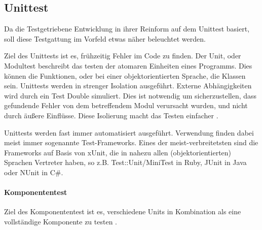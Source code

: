 \subsection{Unittest}
Da die Testgetriebene Entwicklung in ihrer Reinform auf dem Unittest basiert, soll diese Testgattung im Vorfeld etwas näher beleuchtet werden.

Ziel des Unittests ist es, frühzeitig Fehler im Code zu finden. Der Unit, oder Modultest beschreibt das testen der atomaren Einheiten eines Programms. Dies können die Funktionen, oder bei einer objektorientierten Sprache, die Klassen sein. Unittests werden in strenger Isolation ausgeführt. Externe Abhängigkeiten wird durch ein Test Double simuliert. Dies ist notwendig um sicherzustellen, dass gefundende Fehler von dem betreffendem Modul verursacht wurden, und nicht durch äußere Einflüsse. Diese Isolierung macht das Testen einfacher \citep{goodliffe_code_2006}.

Unittests werden fast immer automatisiert ausgeführt. Verwendung finden dabei meist immer sogenannte Test-Frameworks. Eines der meist-verbreitetsten sind die Frameworks auf Basis von xUnit, die in nahezu allen (objektorientierten) Sprachen Vertreter haben, so z.B. Test::Unit/MiniTest in Ruby, JUnit in Java oder NUnit in C\#.
\paragraph{Komponententest}
Ziel des Komponententest ist es, verschiedene Units in Kombination als eine vollständige Komponente zu testen \citep{goodliffe_code_2006}.